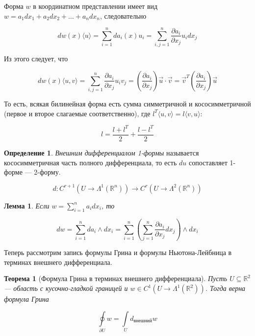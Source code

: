 \documentclass[a5paper]{article}
\newcounter{through}
\theoremstyle{plain}
\newtheorem{theorem}[through]{Теорема}
\newtheorem{lemma}[through]{Лемма}
\theoremstyle{definition}
\newtheorem{definition}[through]{Определение}
\numberwithin{through}{section}
\numberwithin{equation}{section}
\begin{document}
Форма $w$ в координатном представлении имеет вид $w=a_1dx_1 + a_2 dx_2 + \ldots + a_n dx_n$, следовательно

\begin{equation*}
	dw(x) \langle u \rangle = \sum_{i = 1}^{n} da_i(x) u_i = \sum_{i,j = 1}^{n} \frac{\partial a_i}{\partial x_j} u_i dx_j
\end{equation*}

Из этого следует, что 

\begin{equation*}
	dw(x) \langle u, v \rangle = \sum_{i,j = 1}^{n} \frac{\partial a_i}{\partial x_j} u_i v_j = (\frac{\partial a_i}{\partial x_j}) \vec{u} \cdot \vec{v} = \vec{v}^T (\frac{\partial a_i}{\partial x_j}) \vec{u}
\end{equation*}

То есть, всякая билинейная форма есть сумма симметричной и кососимметричной (первое и второе слагаемые соответственно), где $l^T \langle u, v \rangle = l \langle v, u \rangle$:

\begin{equation*}
	l = \frac{l + l^T}{2} + \frac{l - l^T}{2}
\end{equation*} 

\begin{definition}
	\textit{Внешним дифференциалом 1-формы} называется кососимметричная часть полного дифференциала, то есть $du$ сопоставляет 1-форме --- 2-форму.
	
	\begin{equation*}
		d : C^{r+1} (U \to \Lambda^1(\mathbb{R}^n)) \to C^{r} (U \to \Lambda^2(\mathbb{R}^n))
	\end{equation*}
\end{definition}


\begin{lemma}
	Если $w = \sum\limits_{i=1}^{n} a_i dx_i$, то 
	
	\begin{equation*}
		dw = \sum_{i=1}^{n} da_i \wedge dx_i = \sum_{i=1}^{n} \left(\sum_{j=1}^{n} \frac{\partial a_i}{\partial x_j} dx_j\right) \wedge dx_i
	\end{equation*}
\end{lemma}


\medskip

Теперь рассмотрим запись формулы Грина и формулы Ньютона-Лейбница в терминах внешнего дифференциала.

\begin{theorem}[Формула Грина в терминах внешнего дифференциала]
	Пусть $U \subseteq \mathbb{R}^2$ --- область с кусочно-гладкой границей и $w \in C^1 (U \to \Lambda^1(\mathbb{R}^2))$. Тогда верна формула Грина
	
	\begin{equation*}
		\oint\limits_{\partial U} w = \int\limits_{U} d_{\text{внешний}}w
	\end{equation*}
\end{theorem}
\end{document}
